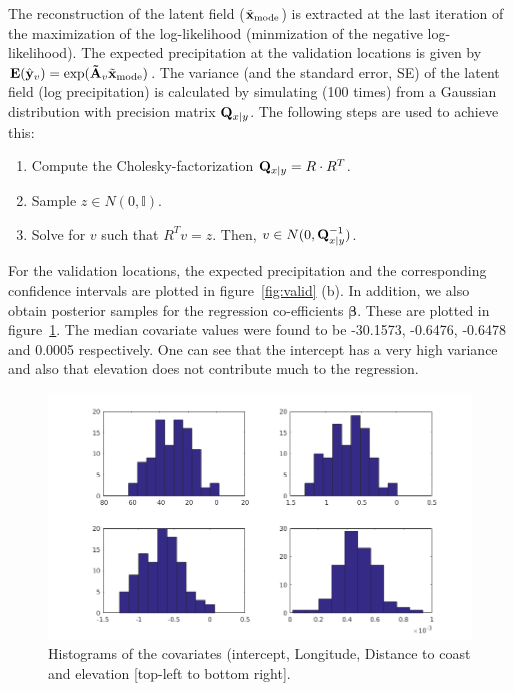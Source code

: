 \documentclass[a4paper,10pt]{article}
\def\bE{{\bf E}}
\def\bQ{{\bf Q}}
\def\btA{{\bf \tilde A}}
\def\bx{{\bf x}}
\def\by{{\bf y}}
\def\bbeta{{\boldsymbol \beta}}
\def\txmode{{\tilde \bx_{\mathrm{mode}}}}
\begin{document}
The reconstruction of the latent field ($\txmode$) is extracted at the last iteration of the maximization of the log-likelihood (minmization of the negative log-likelihood). The expected precipitation at the validation locations is given by $\bE(\hat \by_v) = \exp(\btA_v \txmode)$. The variance (and the standard error, SE) of the latent field (log precipitation) is calculated by simulating (100 times) from a Gaussian distribution with precision matrix $\bQ_{x|y}$. The following steps are used to achieve this:
\begin{enumerate}
 \item Compute the Cholesky-factorization $\bQ_{x|y} = R\cdot R^T$.
 \item Sample $z \in N(0,\mathbb{I})$.
 \item Solve for $v$ such that $R^T v = z$. Then, $v \in N(0,\bQ_{x|y}^{-1})$.
\end{enumerate} 
For the validation locations, the expected precipitation and the corresponding confidence intervals are plotted in figure~\ref{fig:valid} (b). In addition, we also obtain posterior samples for the regression co-efficients $\bbeta$. These are plotted in figure~\ref{fig:covariates}. The median covariate values were found to be -30.1573, -0.6476, -0.6478 and 0.0005 respectively. One can see that the intercept has a very high variance and also that elevation does not contribute much to the regression.
\begin{figure}[ht]
 \centering
 \includegraphics[width=0.8\linewidth]{covariates.png}
 \caption{Histograms of the covariates (intercept, Longitude, Distance to coast and elevation [top-left to bottom right].}
 \label{fig:covariates}
\end{figure}
\end{document}
